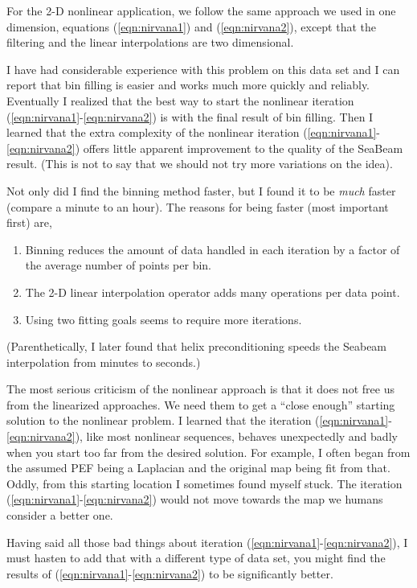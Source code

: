 \par
For the 2-D nonlinear application,
we follow the same approach we used in one dimension,
equations
(\ref{eqn:nirvana1}) and
(\ref{eqn:nirvana2}),
except that the filtering and the linear interpolations
are two dimensional.

\par
I have had considerable experience with this problem on this data set
and I can report that bin filling is easier
and works much more quickly and reliably.
Eventually I realized that the best way to start
the nonlinear iteration (\ref{eqn:nirvana1}-\ref{eqn:nirvana2}) is with
the final result of bin filling.
Then I learned that the extra complexity
of the nonlinear iteration (\ref{eqn:nirvana1}-\ref{eqn:nirvana2})
offers little apparent improvement to the quality of the
SeaBeam result.
(This is not to say that we should not try more variations on the idea).
\par
Not only did I find the binning method faster,
but I found it to be {\it much}
faster (compare a minute to an hour).
The reasons for being faster (most important first) are,
\begin{enumerate}
\item Binning reduces the amount of data handled in each iteration
        by a factor of the average number of points per bin.
\item The 2-D linear interpolation operator adds many operations per data point.
\item Using two fitting goals seems to require more iterations.
\end{enumerate}
(Parenthetically,
I later found that helix preconditioning speeds the Seabeam interpolation
from minutes to seconds.)
\par
The most serious criticism of the nonlinear approach
is that it does not free us from the linearized approaches.
We need them to get a ``close enough'' starting solution
to the nonlinear problem.
I learned that the iteration (\ref{eqn:nirvana1}-\ref{eqn:nirvana2}),
like most nonlinear sequences,
behaves unexpectedly and badly
when you start too far from the desired solution.
For example, I often began from the assumed PEF being a Laplacian
and the original map being fit from that.
Oddly, from this starting location I sometimes found myself stuck.
The iteration (\ref{eqn:nirvana1}-\ref{eqn:nirvana2}) would not move towards the map
we humans consider a better one.
\par
Having said all those bad things about iteration
(\ref{eqn:nirvana1}-\ref{eqn:nirvana2}), I must hasten to add that
with a different type of data set, you might find the results of
(\ref{eqn:nirvana1}-\ref{eqn:nirvana2}) to be significantly better.

